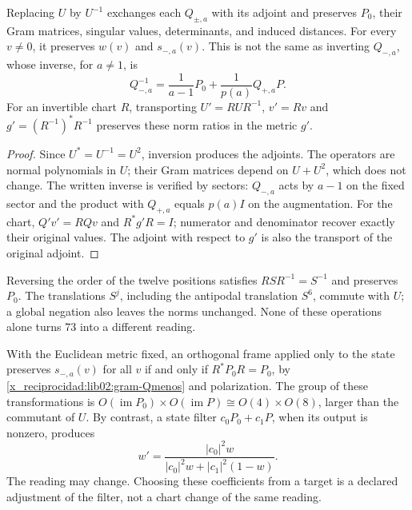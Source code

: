 \begin{proposition}
\label{x_reciprocidad:lib02:inversion-carta}
Replacing \(U\) by \(U^{-1}\) exchanges each \(Q_{\pm,a}\) with its adjoint and preserves \(P_0\), their Gram matrices, singular values, determinants, and induced distances. For every \(v\ne0\), it preserves \(w(v)\) and \(s_{-,a}(v)\). This is not the same as inverting \(Q_{-,a}\), whose inverse, for \(a\ne1\), is
\begin{equation}
 Q_{-,a}^{-1}
 =\frac1{a-1}P_0+\frac1{p(a)}Q_{+,a}P.
 \label{x_reciprocidad:lib02:inversa-Q}
\end{equation}
For an invertible chart \(R\), transporting
\(U'=RUR^{-1}\), \(v'=Rv\) and
\(g'=(R^{-1})^*R^{-1}\) preserves these norm ratios in
the metric \(g'\).
\end{proposition}
\begin{proof}
Since \(U^*=U^{-1}=U^2\), inversion produces the adjoints.
The operators are normal polynomials in \(U\); their Gram matrices depend
on \(U+U^2\), which does not change. The written inverse is verified by
sectors: \(Q_{-,a}\) acts by \(a-1\) on the fixed sector and the product
with \(Q_{+,a}\) equals \(p(a)I\) on the augmentation. For the chart,
\(Q'v'=RQv\) and \(R^*g'R=I\); numerator and denominator recover
exactly their original values. The adjoint with respect to \(g'\)
is also the transport of the original adjoint.
\end{proof}

Reversing the order of the twelve positions satisfies \(RSR^{-1}=S^{-1}\) and preserves \(P_0\). The translations \(S^j\), including the antipodal translation \(S^6\), commute with \(U\); a global negation also leaves the norms unchanged. None of these operations alone turns 73 into a different reading.

With the Euclidean metric fixed, an orthogonal frame applied only to the state preserves \(s_{-,a}(v)\) for all \(v\) if and only if \(R^*P_0R=P_0\), by \eqref{x_reciprocidad:lib02:gram-Qmenos} and polarization. The group of these transformations is \(O(\operatorname{im}P_0)\times O(\operatorname{im}P)
\cong O(4)\times O(8)\), larger than the commutant of \(U\). By contrast, a state filter \(c_0P_0+c_1P\), when its output is nonzero, produces
\begin{equation}
 w'=
 \frac{|c_0|^2w}{|c_0|^2w+|c_1|^2(1-w)}.
 \label{x_reciprocidad:lib02:filtro-pesos}
\end{equation}
The reading may change. Choosing these coefficients from a target is
a declared adjustment of the filter, not a chart change of the same
reading.

